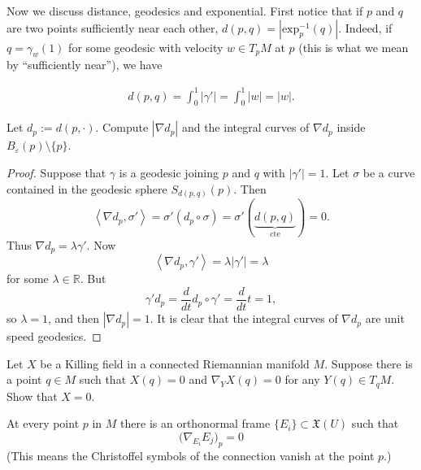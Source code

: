 \medskip\noindent
Now we discuss distance, geodesics and exponential.
First notice that if $p$ and $q$ are two points sufficiently near each other,
$d(p,q)=|\text{exp}^{-1}_p(q)|$.
Indeed, if $q=\gamma_w(1)$ for some geodesic with
velocity $w \in T_pM$ at $p$ (this is what
we mean by ``sufficiently near''),
we have

\begin{align*}
d(p,q)=\int_0^1|\gamma'|=\int_0^1|w|=|w|.
\end{align*}

\begin{exercise}
\label{exercise-differentiate-distance-function}
Let $d_p:=d(p,\cdot)$. Compute $|\nabla d_p|$ and the integral
curves of $\nabla d_p$ inside $B_\varepsilon(p)\setminus\{p\}$.
\end{exercise}

\begin{proof}
Suppose that $\gamma$ is a geodesic joining $p$ and $q$
with $|\gamma'|=1$.
Let $\sigma$ be a curve contained in the geodesic sphere $S_{d(p,q)}(p)$.
Then
$$
\left<\nabla d_p,\sigma'\right>
=\sigma'(d_p\circ \sigma)
=\sigma'(\underbrace{d(p,q)}_{\text{cte}})=0.
$$
Thus $\nabla d_p=\lambda\gamma'$.
Now
$$
\left<\nabla d_p,\gamma'\right>
=\lambda |\gamma'|=\lambda
$$
for some $\lambda \in \mathbb{R}$.
But
$$
\gamma'd_p=\frac{d}{dt}d_p \circ \gamma'
=\frac{d}{dt}t=1,
$$
so $\lambda=1$, and then $|\nabla d_p|=1$.
It is clear that the integral curves of $\nabla d_p$
are unit speed geodesics.
\end{proof}

\begin{exercise}
\label{exercise-killing-field-with-zero-of-order-1}
Let $X$ be a Killing field in a connected Riemannian manifold $M$.
Suppose there is a point $q \in M$ such that
$X(q)=0$ and $\nabla_YX(q)=0$ for any $Y(q) \in T_qM$.
Show that $X=0$.
\end{exercise}


\begin{lemma}
\label{lemma-geodesic-coordinates}
At every point $p$ in $M$ there is an orthonormal frame 
$\{E_i\} \subset \mathfrak{X}(U)$ such that 
\begin{equation}
\label{equation-normal-coordinates-vanishing-Christoffel-symbols}
\Big(\nabla_{E_i}E_j\Big)_p=0
\end{equation}
(This means the Christoffel symbols of the connection vanish at the point $p$.)
\end{lemma}

